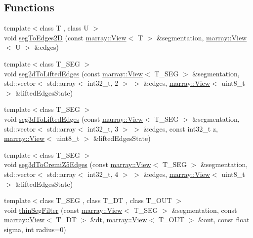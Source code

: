 \subsection*{Functions}
\begin{DoxyCompactItemize}
\item 
{\footnotesize template$<$class T , class U $>$ }\\void \hyperlink{namespacenifty_1_1ground__truth_af49d3596b8aaf59bd7dcf3163e99d08f}{seg\+To\+Edges2\+D} (const \hyperlink{classandres_1_1View}{marray\+::\+View}$<$ T $>$ \&segmentation, \hyperlink{classandres_1_1View}{marray\+::\+View}$<$ U $>$ \&edges)
\item 
{\footnotesize template$<$class T\+\_\+\+S\+E\+G $>$ }\\void \hyperlink{namespacenifty_1_1ground__truth_af4ff3155dceef94452c198adb989d21e}{seg2d\+To\+Lifted\+Edges} (const \hyperlink{classandres_1_1View}{marray\+::\+View}$<$ T\+\_\+\+S\+E\+G $>$ \&segmentation, std\+::vector$<$ std\+::array$<$ int32\+\_\+t, 2 $>$ $>$ \&edges, \hyperlink{classandres_1_1View}{marray\+::\+View}$<$ uint8\+\_\+t $>$ \&lifted\+Edges\+State)
\item 
{\footnotesize template$<$class T\+\_\+\+S\+E\+G $>$ }\\void \hyperlink{namespacenifty_1_1ground__truth_a6d7ab1dca0ac9229967b736100609112}{seg3d\+To\+Lifted\+Edges} (const \hyperlink{classandres_1_1View}{marray\+::\+View}$<$ T\+\_\+\+S\+E\+G $>$ \&segmentation, std\+::vector$<$ std\+::array$<$ int32\+\_\+t, 3 $>$ $>$ \&edges, const int32\+\_\+t z, \hyperlink{classandres_1_1View}{marray\+::\+View}$<$ uint8\+\_\+t $>$ \&lifted\+Edges\+State)
\item 
{\footnotesize template$<$class T\+\_\+\+S\+E\+G $>$ }\\void \hyperlink{namespacenifty_1_1ground__truth_a9db1e8161597359400b066deab0f7dfb}{seg3d\+To\+Cremi\+Z5\+Edges} (const \hyperlink{classandres_1_1View}{marray\+::\+View}$<$ T\+\_\+\+S\+E\+G $>$ \&segmentation, std\+::vector$<$ std\+::array$<$ int32\+\_\+t, 4 $>$ $>$ \&edges, \hyperlink{classandres_1_1View}{marray\+::\+View}$<$ uint8\+\_\+t $>$ \&lifted\+Edges\+State)
\item 
{\footnotesize template$<$class T\+\_\+\+S\+E\+G , class T\+\_\+\+D\+T , class T\+\_\+\+O\+U\+T $>$ }\\void \hyperlink{namespacenifty_1_1ground__truth_a4feb2d90b357085dcc776da2e24a4f64}{thin\+Seg\+Filter} (const \hyperlink{classandres_1_1View}{marray\+::\+View}$<$ T\+\_\+\+S\+E\+G $>$ \&segmentation, const \hyperlink{classandres_1_1View}{marray\+::\+View}$<$ T\+\_\+\+D\+T $>$ \&dt, \hyperlink{classandres_1_1View}{marray\+::\+View}$<$ T\+\_\+\+O\+U\+T $>$ \&out, const float sigma, int radius=0)
\end{DoxyCompactItemize}


